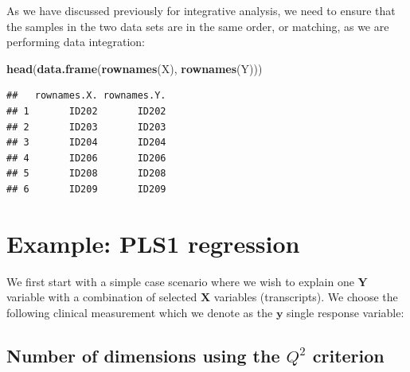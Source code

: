 \documentclass[]{book}
\newenvironment{Shaded}{\begin{snugshade}}{\end{snugshade}}
\newcommand{\KeywordTok}[1]{\textcolor[rgb]{0.13,0.29,0.53}{\textbf{#1}}}
\newcommand{\NormalTok}[1]{#1}
\newcommand{\OperatorTok}[1]{\textcolor[rgb]{0.81,0.36,0.00}{\textbf{#1}}}
\newcommand{\StringTok}[1]{\textcolor[rgb]{0.31,0.60,0.02}{#1}}
\begin{document}
\begin{Shaded}
\end{Shaded}

As we have discussed previously for integrative analysis, we need to ensure that the samples in the two data sets are in the same order, or matching, as we are performing data integration:

\begin{Shaded}
\begin{Highlighting}[]
\KeywordTok{head}\NormalTok{(}\KeywordTok{data.frame}\NormalTok{(}\KeywordTok{rownames}\NormalTok{(X), }\KeywordTok{rownames}\NormalTok{(Y)))}
\end{Highlighting}
\end{Shaded}

\begin{verbatim}
##   rownames.X. rownames.Y.
## 1       ID202       ID202
## 2       ID203       ID203
## 3       ID204       ID204
## 4       ID206       ID206
## 5       ID208       ID208
## 6       ID209       ID209
\end{verbatim}

\hypertarget{example-pls1-regression}{%
\section{Example: PLS1 regression}\label{example-pls1-regression}}

We first start with a simple case scenario where we wish to explain one \(\boldsymbol Y\) variable with a combination of selected \(\boldsymbol X\) variables (transcripts). We choose the following clinical measurement which we denote as the \(\boldsymbol y\) single response variable:

\begin{Shaded}
\end{Shaded}

\hypertarget{number-of-dimensions-using-the-q2-criterion}{%
\subsection{\texorpdfstring{Number of dimensions using the \(Q^2\) criterion}{Number of dimensions using the Q\^{}2 criterion}}\label{number-of-dimensions-using-the-q2-criterion}}
\end{document}
